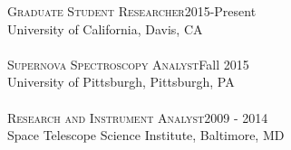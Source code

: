 \documentclass[10pt]{cv}
\begin{document}
\begin{llist}
\vspace{-0.1in}   
    \textsc{Graduate Student Researcher}\hfill2015-Present \\
    University of California, Davis, CA\\
\\
\textsc{Supernova Spectroscopy Analyst}\hfill Fall 2015\\ 
University of Pittsburgh, Pittsburgh, PA\\
\\
\textsc{Research and Instrument Analyst}\hfill 2009 - 2014 \\
Space Telescope Science Institute, Baltimore, MD\\


\end{llist}
\end{document}

